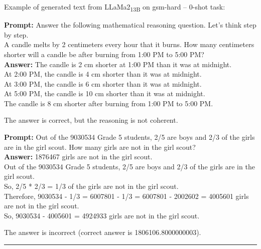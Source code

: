 \noindent Example of generated text from LLaMa2\textsubscript{13B} on gsm-hard -- 0-shot task:
\begin{displayquote}
	\textbf{Prompt:} Answer the following mathematical reasoning question. Let’s think step by step.\\
	A candle melts by 2 centimeters every hour that it burns. How many centimeters shorter will a candle be after burning from 1:00 PM to 5:00 PM?\\
	\textbf{Answer:} The candle is 2 cm shorter at 1:00 PM than it was at midnight.\\
	At 2:00 PM, the candle is 4 cm shorter than it was at midnight.\\
	At 3:00 PM, the candle is 6 cm shorter than it was at midnight.\\
	At 5:00 PM, the candle is 10 cm shorter than it was at midnight.\\
	The candle is 8 cm shorter after burning from 1:00 PM to 5:00 PM\@.
\end{displayquote}
The answer is correct, but the reasoning is not coherent.
\begin{displayquote}
	\textbf{Prompt:} Out of the 9030534 Grade 5 students, 2/5 are boys and 2/3 of the girls are in the girl scout. How many girls are not in the girl scout?\\
	\textbf{Answer:} 1876467 girls are not in the girl scout.\\
	Out of the 9030534 Grade 5 students, 2/5 are boys and 2/3 of the girls are in the girl scout.\\
	So, 2/5 * 2/3 = 1/3 of the girls are not in the girl scout.\\
	Therefore, 9030534 - 1/3 = 6007801 - 1/3 = 6007801 - 2002602 = 4005601 girls are not in the girl scout.\\
	So, 9030534 - 4005601 = 4924933 girls are not in the girl scout.\\
\end{displayquote}
The answer is incorrect (correct answer is 1806106.8000000003).

\noindent\rule{\textwidth}{0.4pt}

